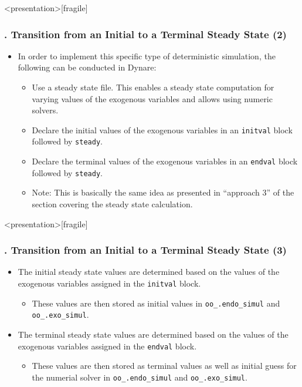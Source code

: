 \documentclass[11pt,aspectratio=169]{beamer}
\begin{document}
\begin{frame}<presentation>[fragile]
	\frametitle{{\thesection.\thesubsection\thinspace\thesubsubsection} Transition from an Initial to a Terminal Steady State (2)}
	\begin{itemize}
		\item In order to implement this specific type of deterministic simulation, the following can be conducted in Dynare:
		\begin{itemize}
			\item Use a steady state file. This enables a steady state computation for varying values of the exogenous variables and allows using numeric solvers.
			\item Declare the initial values of the exogenous variables in an \texttt{initval} block followed by \texttt{steady}.
			\item Declare the terminal values of the exogenous variables in an \texttt{endval} block followed by \texttt{steady}.
			\item Note: This is basically the same idea as presented in ``approach 3'' of the section covering the steady state calculation.
		\end{itemize}
	\end{itemize}
\end{frame}
\begin{frame}<presentation>[fragile]
	\frametitle{{\thesection.\thesubsection\thinspace\thesubsubsection} Transition from an Initial to a Terminal Steady State (3)}
	\begin{itemize}
		\item The initial steady state values are determined based on the values of the exogenous variables assigned in the \texttt{initval} block. 
		\begin{itemize}
			\item These values are then stored as initial values in \texttt{oo\_.endo\_simul} and \texttt{oo\_.exo\_simul}.
		\end{itemize}
		\item The terminal steady state values are determined based on the values of the exogenous variables assigned in the \texttt{endval} block. 
		\begin{itemize}
			\item These values are then stored as terminal values as well as initial guess for the numerial solver in \texttt{oo\_.endo\_simul} and \texttt{oo\_.exo\_simul}.
		\end{itemize}
	\end{itemize}
\end{frame}
\end{document}
